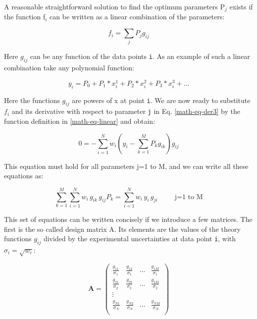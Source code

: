A reasonable straightforward solution to find the optimum parameters 
P$_{j}$ exists if 
the function f$_{i}$ can be written as a linear combination 
of the parameters:

\begin{equation}
  f_{i} = \sum_j P_{j} g_{ij}
  \label{math-eq-linear}
\end{equation}

Here $g_{ij}$ can be any function of the data points {\tt i}. As an example
of such a linear combination take any polynomial function:

\begin{equation}
  y_{i} = P_{0} + P_1*x_{i}^1 + P_2*x_{i}^2 + P_3*x_{i}^3 + ...
\end{equation}

Here the functions $g_{ij}$ are powers of x at point {\tt i}. 
We are now ready to substitute $f_{i}$ and its derivative with respect to 
parameter {\tt j} in Eq. \ref{math-eq-der3} by the function definition in 
\ref{math-eq-linear} and obtain:

\begin{equation}
  0 = - \sum_{i=1}^{N}  w_{i}
  \left ( 
  y_{i} - \sum_{k=1}^{M} P_{k} g_{ik}
  \right ) g_{ij}
  \label{math-eq-lin1}
\end{equation}

This equation must hold for all parameters j=1 to M, and we can write all 
these equations as:

\begin{equation}
  \sum_{k=1}^{M} \sum_{i=1}^{N}  w_{i} \, g_{ik} \, g_{ij} P_{k} 
  =
  \sum_{i=1}^{N}  w_{i} \, y_{i} \, g_{ji}
  \quad ~ \quad ~ \mbox{j=1 to M}
  \label{math-eq-lin2}
\end{equation}

This set of equations can be written concisely if we introduce a few 
matrices. The first is the so called design matrix A. Its elements are the
values of the theory functions $g_{ij}$ divided by the experimental 
uncertainties at data point {\tt i}, with $\sigma_{i} = \sqrt{w_{i}}$:

\begin{equation}
   \mathbf{A} = \left ( {
     \begin{array}{cccc}
        \frac{g_{11}}{\sigma_{1}} & 
        \frac{g_{12}}{\sigma_{1}} &
        \dots                     &
        \frac{g_{1M}}{\sigma_{1}} \\
        \frac{g_{21}}{\sigma_{2}} & 
        \frac{g_{22}}{\sigma_{2}} &
        \dots                     &
        \frac{g_{2M}}{\sigma_{2}} \\
        \vdots & ~ & ~ & ~ \\
        \frac{g_{N1}}{\sigma_{N}} & 
        \frac{g_{N2}}{\sigma_{N}} &
        \dots                     &
        \frac{g_{NM}}{\sigma_{N}} \\
     \end{array}
   } \right )
  \label{math-eq-des}
\end{equation}

